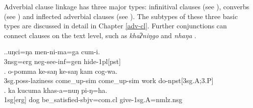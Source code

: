 Adverbial clause linkage has three major types: infinitival clauses (see \Next[a]), converbs (see \Next[b]) and inflected adverbial clauses (see \Next[c]). The subtypes of these three basic types are discussed in detail in Chapter \ref{adv-cl}. Further conjunctions can connect clauses on the text level, such as \emph{khaʔniŋgo}  and \emph{nhaŋa} .

\ex.\ag.uŋci=ŋa men-ni-ma=ga cum-i.\\
{\sc 3nsg=erg} {\sc neg-}see{\sc -inf=gen} hide{\sc -1pl[pst]}\\
\bg.	o-pomma ke-saŋ ke-saŋ kam cog-wa.\\
	{\sc 3sg.poss-}laziness come\_up-{\sc sim} come\_up-{\sc sim} work do{\sc -npst[3sg.A;3.P]}\\
\bg. ka kucuma khas-a=nuŋ pi-ŋ=ha.\\
{\sc 1sg[erg]} dog   be\_satisfied{\sc [3sg]-sbjv=com.cl} give{\sc [pst;3.P]-1sg.A=nmlz.nsg}\\





